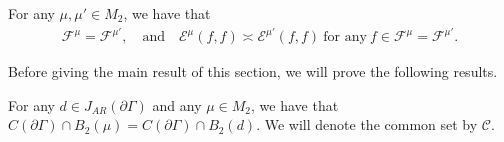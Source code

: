 \documentclass[AHL,Unicode,longabstracts,published]{cedram}
\newcommand{\ce}{\mathcal{E}}
\newcommand{\cf}{\mathcal{F}}
\newcommand{\cC}{\mathcal{C}}
\begin{document}
\begin{prop}\label{psc}
For any $\mu,\mu'\in M_2$, we have that
\begin{align*}
\cf^{\mu}=\cf^{\mu'}, \quad\text{and}\quad \ce^{\mu}(f,f)\asymp\ce^{\mu'}(f,f)\ \text{for\ any}\ f\in\cf^{\mu}=\cf^{\mu'}.
\end{align*}
\end{prop}

Before giving the main result of this section, we will prove the following results.

\begin{lemm}\label{c}
For any $d\in J_{AR}(\partial\Gamma)$ and any $\mu\in M_2$, we have that $C(\partial \Gamma)\cap B_2(\mu)=C(\partial \Gamma)\cap B_2(d)$. We will denote the common set by $\cC$.
\end{lemm}
\end{document}
